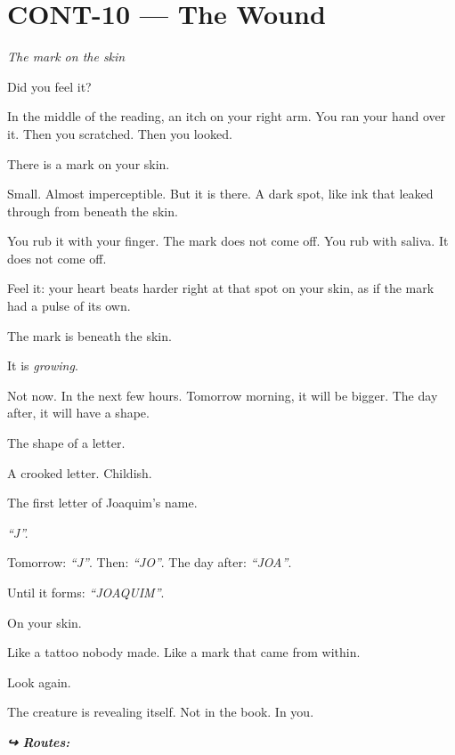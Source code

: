 \section*{\textbf{CONT-10} --- The Wound}

\noindent \textit{The mark on the skin}

\noindent Did you feel it?

\noindent In the middle of the reading, an itch on your right arm. You ran your hand over it. Then you scratched. Then you looked.

\noindent There is a mark on your skin.

\noindent Small. Almost imperceptible. But it is there. A dark spot, like ink that leaked through from beneath the skin.

\noindent You rub it with your finger. The mark does not come off. You rub with saliva. It does not come off.

\noindent Feel it: your heart beats harder right at that spot on your skin, as if the mark had a pulse of its own.

\noindent The mark is beneath the skin.

\noindent It is \textit{growing}.

\noindent Not now. In the next few hours. Tomorrow morning, it will be bigger. The day after, it will have a shape.

\noindent The shape of a letter.

\noindent A crooked letter. Childish.

\noindent The first letter of Joaquim's name.

\noindent \textit{\textquotedblleft{}J\textquotedblright{}.}

\noindent Tomorrow: \textit{\textquotedblleft{}J\textquotedblright{}}.
Then: \textit{\textquotedblleft{}JO\textquotedblright{}}.
The day after: \textit{\textquotedblleft{}JOA\textquotedblright{}}.

\noindent Until it forms: \textit{\textquotedblleft{}JOAQUIM\textquotedblright{}}.

\noindent On your skin.

\noindent Like a tattoo nobody made.
Like a mark that came from within.

\noindent Look again.

\noindent The creature is revealing itself.
Not in the book.
In you.

\vspace{0.5em}
\noindent\textit{\textbf{↪ Routes:}  \rotasep {}}
